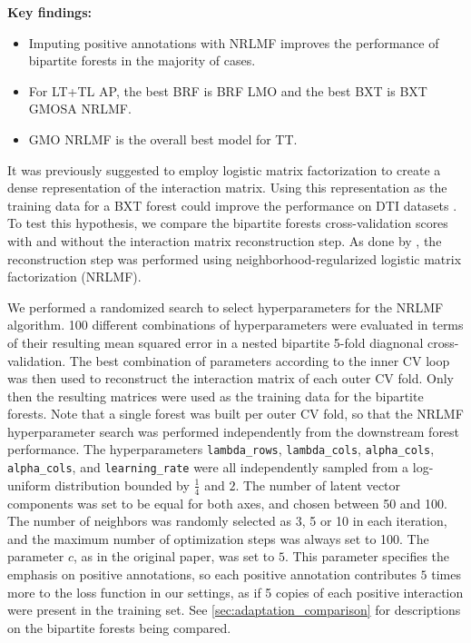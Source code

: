 \begin{mdframed}
    \textbf{Key findings:}
    \begin{itemize}
        \item Imputing positive annotations with NRLMF improves the performance of bipartite forests in the majority of cases.
        \item For LT+TL AP, the best BRF is BRF LMO and the best BXT is BXT GMOSA NRLMF.
        \item GMO NRLMF is the overall best model for TT.
    \end{itemize}
\end{mdframed}

It was previously suggested to employ logistic matrix factorization to create a dense representation of the interaction matrix. Using this representation as the training data for a BXT forest could improve the performance on DTI datasets \cite{pliakos2020drugtarget}.
To test this hypothesis, we compare the bipartite forests cross-validation scores with and without the interaction matrix reconstruction step. As done by \cite{pliakos2020drugtarget}, the reconstruction step was performed using neighborhood-regularized logistic matrix factorization (NRLMF)\cite{liu2016neighborhood}.

We performed a randomized search to select hyperparameters for the NRLMF algorithm. 100 different combinations of hyperparameters were evaluated
in terms of their resulting mean squared error in a nested bipartite 5-fold diagnonal cross-validation.
The best combination of parameters according to the inner CV loop was then used to reconstruct the interaction matrix of each outer CV fold. Only then the resulting matrices were used as the training data for the bipartite forests. Note that a single forest was built per outer CV fold, so that the NRLMF hyperparameter search was performed independently from the downstream forest performance. The hyperparameters \texttt{lambda\_rows}, \texttt{lambda\_cols}, \texttt{alpha\_cols}, \texttt{alpha\_cols}, and \texttt{learning\_rate} were all independently sampled from a log-uniform distribution bounded by $\frac{1}{4}$ and $2$. The number of latent vector components was set to be equal for both axes, and chosen between 50 and 100. The number of neighbors was randomly selected as 3, 5 or 10 in each iteration, and the maximum number of optimization steps was always set to 100. The parameter $c$, as in the original paper, was set to $5$. This parameter specifies the emphasis on positive annotations, so each positive annotation contributes $5$ times more to the loss function in our settings, as if 5 copies of each positive interaction were present in the training set.
%
See \autoref{sec:adaptation_comparison} for descriptions on the bipartite forests being compared.


